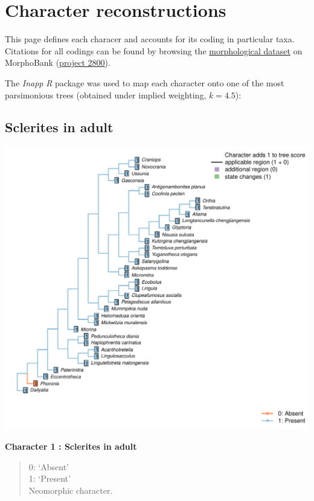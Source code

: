 \documentclass[]{book}
\theoremstyle{definition}
\theoremstyle{definition}
\theoremstyle{definition}
\theoremstyle{remark}
\begin{document}
\hypertarget{reconstructions}{%
\chapter{Character reconstructions}\label{reconstructions}}

This page defines each characer and accounts for its coding in
particular taxa. Citations for all codings can be found by browsing the
\protect\hyperlink{dataset}{morphological dataset} on MorphoBank
(\href{https://morphobank.org/permalink/?P2800}{project 2800}).

The \emph{Inapp} \emph{R} package \citep{Brazeau2018} was used to map
each character onto one of the most parsimonious trees (obtained under
implied weighting, \(k = 4.5\)):

\hypertarget{sclerites-in-adult}{%
\section*{Sclerites in adult}\label{sclerites-in-adult}}

\includegraphics{Brachiopod_phylogeny_files/figure-latex/unnamed-chunk-5-1.pdf}

\textbf{Character 1 : Sclerites in adult }

\begin{quote}
0: `Absent'\\
1: `Present'\\
Neomorphic character.
\end{quote}
\end{document}
